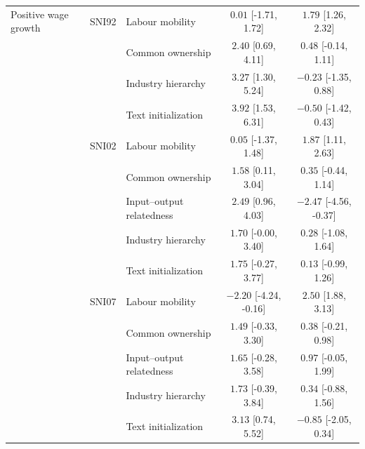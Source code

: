 \begin{table}[htbp]
\begin{tabular}{lllcc}
\midrule
Positive wage growth & SNI92 & Labour mobility & $0.01$ [-1.71, 1.72] & $1.79$ [1.26, 2.32] \\
 &  & Common ownership & $2.40$ [0.69, 4.11] & $0.48$ [-0.14, 1.11] \\
 &  & Industry hierarchy & $3.27$ [1.30, 5.24] & $-0.23$ [-1.35, 0.88] \\
 &  & Text initialization & $3.92$ [1.53, 6.31] & $-0.50$ [-1.42, 0.43] \\
\addlinespace[2pt]
 & SNI02 & Labour mobility & $0.05$ [-1.37, 1.48] & $1.87$ [1.11, 2.63] \\
 &  & Common ownership & $1.58$ [0.11, 3.04] & $0.35$ [-0.44, 1.14] \\
 &  & Input--output relatedness & $2.49$ [0.96, 4.03] & $-2.47$ [-4.56, -0.37] \\
 &  & Industry hierarchy & $1.70$ [-0.00, 3.40] & $0.28$ [-1.08, 1.64] \\
 &  & Text initialization & $1.75$ [-0.27, 3.77] & $0.13$ [-0.99, 1.26] \\
\addlinespace[2pt]
 & SNI07 & Labour mobility & $-2.20$ [-4.24, -0.16] & $2.50$ [1.88, 3.13] \\
 &  & Common ownership & $1.49$ [-0.33, 3.30] & $0.38$ [-0.21, 0.98] \\
 &  & Input--output relatedness & $1.65$ [-0.28, 3.58] & $0.97$ [-0.05, 1.99] \\
 &  & Industry hierarchy & $1.73$ [-0.39, 3.84] & $0.34$ [-0.88, 1.56] \\
 &  & Text initialization & $3.13$ [0.74, 5.52] & $-0.85$ [-2.05, 0.34] \\
\bottomrule
\end{tabular}
\end{table}
